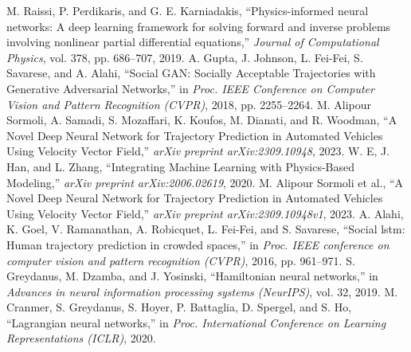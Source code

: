 \documentclass[conference]{IEEEtran}
\begin{document}
\begin{thebibliography}{00}
 M. Raissi, P. Perdikaris, and G. E. Karniadakis, ``Physics-informed neural networks: A deep learning framework for solving forward and inverse problems involving nonlinear partial differential equations,'' \textit{Journal of Computational Physics}, vol. 378, pp. 686--707, 2019.
 A. Gupta, J. Johnson, L. Fei-Fei, S. Savarese, and A. Alahi, ``Social GAN: Socially Acceptable Trajectories with Generative Adversarial Networks,'' in \textit{Proc. IEEE Conference on Computer Vision and Pattern Recognition (CVPR)}, 2018, pp. 2255--2264.
 M. Alipour Sormoli, A. Samadi, S. Mozaffari, K. Koufos, M. Dianati, and R. Woodman, ``A Novel Deep Neural Network for Trajectory Prediction in Automated Vehicles Using Velocity Vector Field,'' \textit{arXiv preprint arXiv:2309.10948}, 2023.
 W. E, J. Han, and L. Zhang, ``Integrating Machine Learning with Physics-Based Modeling,'' \textit{arXiv preprint arXiv:2006.02619}, 2020.
 M. Alipour Sormoli et al., ``A Novel Deep Neural Network for Trajectory Prediction in Automated Vehicles Using Velocity Vector Field,'' \textit{arXiv preprint arXiv:2309.10948v1}, 2023.
 A. Alahi, K. Goel, V. Ramanathan, A. Robicquet, L. Fei-Fei, and S. Savarese, ``Social lstm: Human trajectory prediction in crowded spaces,'' in \textit{Proc. IEEE conference on computer vision and pattern recognition (CVPR)}, 2016, pp. 961--971.
 S. Greydanus, M. Dzamba, and J. Yosinski, ``Hamiltonian neural networks,'' in \textit{Advances in neural information processing systems (NeurIPS)}, vol. 32, 2019.
 M. Cranmer, S. Greydanus, S. Hoyer, P. Battaglia, D. Spergel, and S. Ho, ``Lagrangian neural networks,'' in \textit{Proc. International Conference on Learning Representations (ICLR)}, 2020.

\end{thebibliography}
\end{document}
